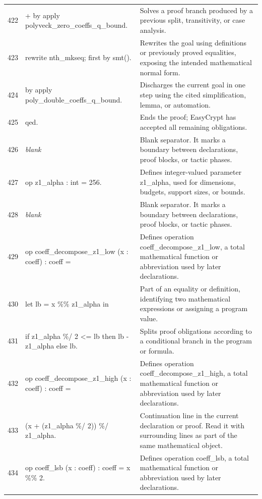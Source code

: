 \documentclass[10pt]{article}
\begin{document}
\begin{longtable}{r L{0.53\textwidth} L{0.37\textwidth}}
422 & {\ttfamily\scriptsize + by apply polyveck\_zero\_coeffs\_q\_bound.} & Solves a proof branch produced by a previous split, transitivity, or case analysis. \\
423 & {\ttfamily\scriptsize rewrite nth\_mkseq; first by smt().} & Rewrites the goal using definitions or previously proved equalities, exposing the intended mathematical normal form. \\
424 & {\ttfamily\scriptsize by apply poly\_double\_coeffs\_q\_bound.} & Discharges the current goal in one step using the cited simplification, lemma, or automation. \\
425 & {\ttfamily\scriptsize qed.} & Ends the proof; EasyCrypt has accepted all remaining obligations. \\
426 & {\ttfamily\scriptsize \emph{blank}} & Blank separator.  It marks a boundary between declarations, proof blocks, or tactic phases. \\
427 & {\ttfamily\scriptsize op z1\_alpha : int = 256.} & Defines integer-valued parameter z1\_alpha, used for dimensions, budgets, support sizes, or bounds. \\
428 & {\ttfamily\scriptsize \emph{blank}} & Blank separator.  It marks a boundary between declarations, proof blocks, or tactic phases. \\
429 & {\ttfamily\scriptsize op coeff\_decompose\_z1\_low (x : coeff) : coeff =} & Defines operation coeff\_decompose\_z1\_low, a total mathematical function or abbreviation used by later declarations. \\
430 & {\ttfamily\scriptsize   let lb = x \%\% z1\_alpha in} & Part of an equality or definition, identifying two mathematical expressions or assigning a program value. \\
431 & {\ttfamily\scriptsize   if z1\_alpha \%/ 2 <= lb then lb - z1\_alpha else lb.} & Splits proof obligations according to a conditional branch in the program or formula. \\
432 & {\ttfamily\scriptsize op coeff\_decompose\_z1\_high (x : coeff) : coeff =} & Defines operation coeff\_decompose\_z1\_high, a total mathematical function or abbreviation used by later declarations. \\
433 & {\ttfamily\scriptsize   (x + (z1\_alpha \%/ 2)) \%/ z1\_alpha.} & Continuation line in the current declaration or proof.  Read it with surrounding lines as part of the same mathematical object. \\
434 & {\ttfamily\scriptsize op coeff\_lsb (x : coeff) : coeff = x \%\% 2.} & Defines operation coeff\_lsb, a total mathematical function or abbreviation used by later declarations. \\

\end{longtable}
\end{document}
